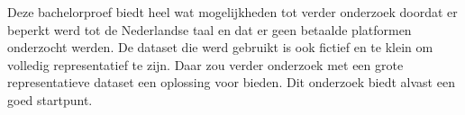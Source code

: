 Deze bachelorproef biedt heel wat mogelijkheden tot verder onderzoek doordat er beperkt werd tot de Nederlandse taal en dat er geen betaalde platformen onderzocht werden. De dataset die werd gebruikt is ook fictief en te klein om volledig representatief te zijn. Daar zou verder onderzoek met een grote representatieve dataset een oplossing voor bieden. Dit onderzoek biedt alvast een goed startpunt.





























